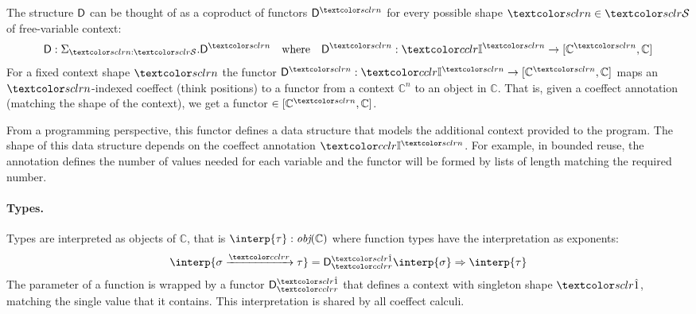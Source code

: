 The structure $\mathsf{D}$ can be thought of as a coproduct of functors $\D^{\sclrd{n}}$ for every
possible shape $\sclrd{n} \in \SH$ of free-variable context:
\begin{equation*}
\D : \Sigma_{\sclrd{n} : \SH}. \D^{\sclrd{n}}
\quad \text{where} \quad
\D^{\sclrd{n}} : \Icat^{\sclrd{n}} \rightarrow [\mathbb{C}^{\sclrd{n}}, \mathbb{C}]
\end{equation*}
For a fixed context shape $\sclrd{n}$ the functor $\D^{\sclrd{n}} :
\Icat^{\sclrd{n}} \rightarrow [\mathbb{C}^{\sclrd{n}}, \mathbb{C}]$ 
maps an $\sclrd{n}$-indexed coeffect (think positions) to a functor from a
context $\mathbb{C}^n$ to an object in $\mathbb{C}$. That is, given a coeffect
annotation (matching the shape of the context), we get a 
functor $\in [\mathbb{C}^{\sclrd{n}},\mathbb{C}]$. 
%

From a programming 
perspective, this functor defines a data structure that models the additional
context provided to the program. The shape of this data structure depends on the coeffect
annotation $\Icat^{\sclrd{n}}$. For example, in bounded reuse, the annotation defines
the number of values needed for each variable and the functor will be 
formed by lists of length matching the required number. 

%
%

%
%

\paragraph{Types.} 
Types are interpreted as objects of $\mathbb{C}$, that is 
$\interp{\tau} : \emph{obj}(\mathbb{C})$
 where function types have the interpretation as exponents: 
%
\begin{align*}
  \interp{\sigma \xrightarrow{\cclrd{r}} \tau} = \D^{\sunit}_{\cclrd{r}} \interp{\sigma}
  \Rightarrow \interp{\tau}
\end{align*}
The parameter of a function is wrapped by 
a functor $\D^{\sunit}_{\cclrd{r}}$ that defines a context with singleton shape
$\sunit$, matching the single value that it contains.
This interpretation is shared by all coeffect calculi. 

